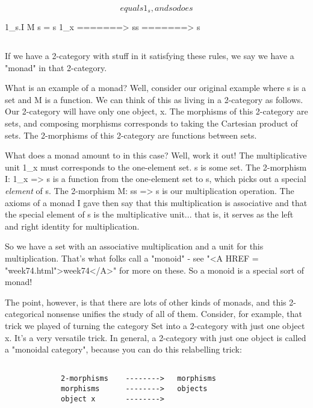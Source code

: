 $$
    
equals 1_{s}, and so does


$$

                         1_{s}.I         M
             s = s 1_{x}  =======> ss =======> s

$$
    
If we have a 2-category with stuff in it satisfying these rules, 
we say we have a "monad" in that 2-category.

What is an example of a monad?  Well, consider our original example
where s is a set and M is a function.  We can think of this as living in
a 2-category as follows.  Our 2-category will have only one object, x.
The morphisms of this 2-category are sets, and composing morphisms
corresponds to taking the Cartesian product of sets.  The 2-morphisms
of this 2-category are functions between sets.  

What does a monad amount to in this case?  Well, work it out!  The
multiplicative unit 1_{x} must corresponds to the one-element set.  s is
some set.  The 2-morphism I: 1_{x} => s is a function from the one-element
set to s, which picks out a special \emph{element} of s.  The 2-morphism 
M: ss => s is our multiplication operation.  The axioms of a monad I
gave then say that this multiplication is associative and that the
special element of s is the multiplicative unit... that is, it serves as
the left and right identity for multiplication.  

So we have a set with an associative multiplication and a unit for this
multiplication.  That's what folks call a "monoid" - see "<A HREF = "week74.html">week74</A>"
for more on these.  So a monoid is a special sort of monad!

The point, however, is that there are lots of other kinds of monads, and
this 2-categorical nonsense unifies the study of all of them.  Consider,
for example, that trick we played of turning the category Set into a
2-category with just one object x.  It's a very versatile trick.  In
general, a 2-category with just one object is called a "monoidal
category", because you can do this relabelling trick:


\begin{verbatim}

             2-morphisms    -------->   morphisms
             morphisms      -------->   objects
             object x       -------->   

\end{verbatim}
    

